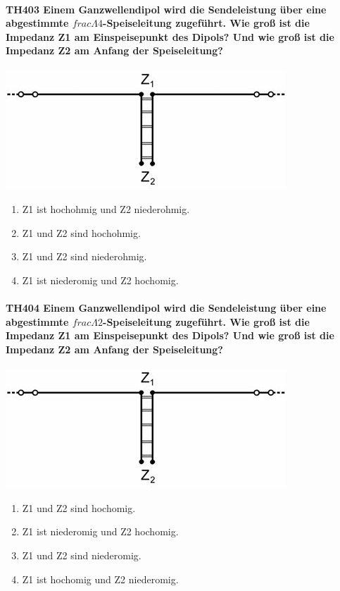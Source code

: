 \documentclass[8pt]{article}
\begin{document}
\paragraph*{TH403 Einem Ganzwellendipol wird die Sendeleistung über eine abgestimmte $frac{\Lambda}{4}$-Speiseleitung zugeführt. Wie groß ist die Impedanz Z1 am Einspeisepunkt des Dipols? Und wie groß ist die Impedanz Z2 am Anfang der Speiseleitung?}
\begin{center}
	\begin{minipage}{\linewidth}
		\centering
		\includegraphics[scale=1.0]{pics/th403_a.jpg}
	\end{minipage}
\end{center}
\begin{enumerate}[nolistsep,label=\Alph*]
\item Z1 ist hochohmig und Z2 niederohmig.
\item Z1 und Z2 sind hochohmig.
\item Z1 und Z2 sind niederohmig.
\item Z1 ist niederomig und Z2 hochomig.
\end{enumerate}

\paragraph*{TH404 Einem Ganzwellendipol wird die Sendeleistung über eine abgestimmte $frac{\Lambda}{2}$-Speiseleitung zugeführt. Wie groß ist die Impedanz Z1 am Einspeisepunkt des Dipols? Und wie groß ist die Impedanz Z2 am Anfang der Speiseleitung?}
\begin{center}
	\begin{minipage}{\linewidth}
		\centering
		\includegraphics[scale=1.0]{pics/th404_a.jpg}
	\end{minipage}
\end{center}
\begin{enumerate}[nolistsep,label=\Alph*]
\item Z1 und Z2 sind hochomig.
\item Z1 ist niederomig und Z2 hochomig.
\item Z1 und Z2 sind niederomig.
\item Z1 ist hochomig und Z2 niederomig.
\end{enumerate}
\end{document}
